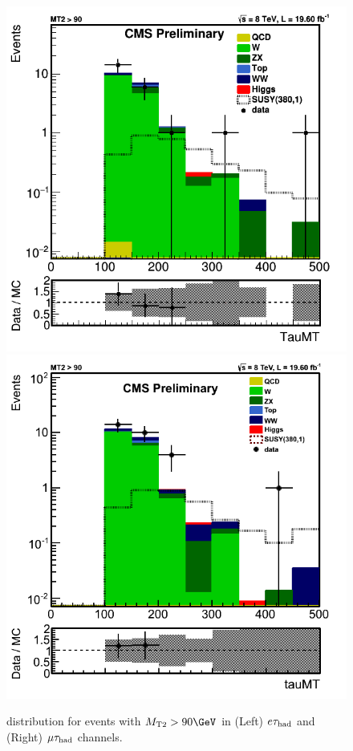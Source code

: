 \begin{figure}[!Hhtb]
\centering
\includegraphics[angle=0,scale=0.35]{SelectionEleTau/TauMT.png}
\includegraphics[angle=0,scale=0.35]{SelectionMuTau/tauMT_Ratio_MT2gt90_unBlinded.png}
\caption{\tauMT distribution for events with $\mttwo>90\GeV$ in (Left) $e\tau_{\rm had}$ and (Right) $\mu\tau_{\rm had}$ channels.}
\label{fig:taumtleptontau}
\end{figure}
